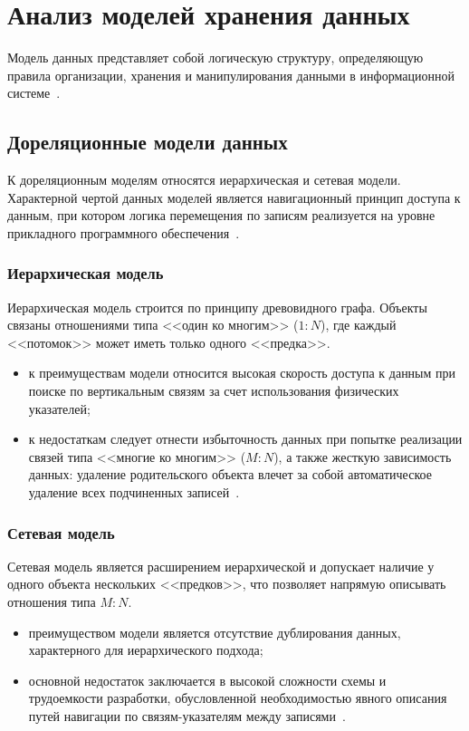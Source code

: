 \section{Анализ моделей хранения данных}

Модель данных представляет собой логическую структуру, определяющую правила организации, хранения и манипулирования данными в информационной системе~\cite{avrunev}. 

\subsection{Дореляционные модели данных}

К дореляционным моделям относятся иерархическая и сетевая модели. Характерной чертой данных моделей является навигационный принцип доступа к данным, при котором логика перемещения по записям реализуется на уровне прикладного программного обеспечения~\cite{avrunev}.

\subsubsection{Иерархическая модель}
Иерархическая модель строится по принципу древовидного графа. Объекты связаны отношениями типа <<один ко многим>> ($1:N$), где каждый <<потомок>> может иметь только одного <<предка>>.
\begin{itemize}
	\item к преимуществам модели относится высокая скорость доступа к данным при поиске по вертикальным связям за счет использования физических указателей;
	\item к недостаткам следует отнести избыточность данных при попытке реализации связей типа <<многие ко многим>> ($M:N$), а также жесткую зависимость данных: удаление родительского объекта влечет за собой автоматическое удаление всех подчиненных записей~\cite{avrunev}.
\end{itemize}

\subsubsection{Сетевая модель}
Сетевая модель является расширением иерархической и допускает наличие у одного объекта нескольких <<предков>>, что позволяет напрямую описывать отношения типа $M:N$.
\begin{itemize}
	\item преимуществом модели является отсутствие дублирования данных, характерного для иерархического подхода;
	\item основной недостаток заключается в высокой сложности схемы и трудоемкости разработки, обусловленной необходимостью явного описания путей навигации по связям-указателям между записями~\cite{avrunev}.
\end{itemize}

